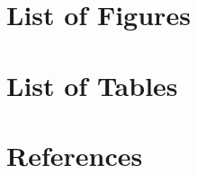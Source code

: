 \documentclass[12pt,a4paper]{article}
\begin{document}
\newpage
\section{List of Figures}
\listoffigures

\newpage
\section{List of Tables}
\listoftables

\newpage
\section{References}

\pagebreak
{}
\setcounter{page}{\thesavepage}
\pagestyle{plain}
%
%
\printbibliography[]
\clearpage
\appendix
\end{document}
